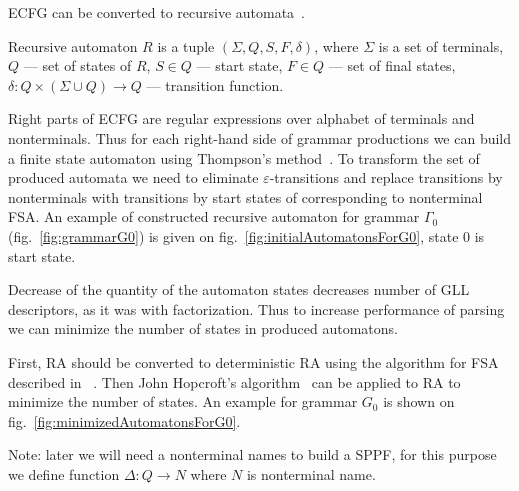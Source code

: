 \documentclass[runningheads,a4paper]{llncs}
\begin{document}
ECFG can be converted to recursive automata~\cite{tellier2006learning}.

\begin{mydef}
    Recursive automaton $R$ is a tuple $(\Sigma, Q, S, F, \delta)$, where
    $\Sigma$ is a set of terminals,
    $Q$ --- set of states of $R$,
    $S \in Q$ --- start state,
    $F \in Q$ --- set of final states,
    $\delta : Q \times (\Sigma \cup Q) \to Q$ --- transition function.
\end{mydef}

Right parts of ECFG are regular expressions over alphabet of terminals and nonterminals.
Thus for each right-hand side of grammar productions we can build a finite state automaton 
using Thompson's method~\cite{Thompson:1968:PTR:363347.363387}. 
To transform the set of produced automata we need to eliminate $\varepsilon$-transitions and replace
transitions by nonterminals with transitions by start states of corresponding to nonterminal FSA.
An example of constructed recursive automaton for grammar $\Gamma_{0}$(fig.~\ref{fig:grammarG0})
is given on fig.~\ref{fig:initialAutomatonsForG0}, state 0 is start state.

Decrease of the quantity of the automaton states decreases number of GLL descriptors, as it was with factorization.
Thus to increase performance of parsing we can minimize the number of states in produced automatons.

First, RA should be converted to deterministic RA using the algorithm for FSA described in ~\cite{aho1974design}.
Then John Hopcroft's algorithm~\cite{hopcroft1971n} can be applied to RA to minimize the number of states.
An example for grammar $G_0$ is shown on fig.~\ref{fig:minimizedAutomatonsForG0}.

Note: later we will need a nonterminal names to build a SPPF, for this purpose we define function $\Delta : Q \to N$ where $N$
is nonterminal name.
\end{document}
